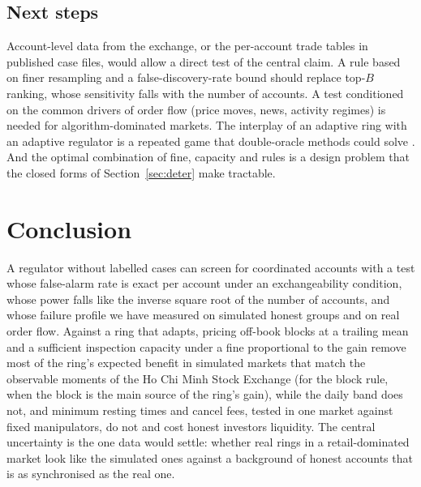 \subsection{Next steps}

Account-level data from the exchange, or the per-account trade tables in published case files, would allow a direct test of the central claim. A rule based on finer resampling and a false-discovery-rate bound should replace top-$B$ ranking, whose sensitivity falls with the number of accounts. A test conditioned on the common drivers of order flow (price moves, news, activity regimes) is needed for algorithm-dominated markets. The interplay of an adaptive ring with an adaptive regulator is a repeated game that double-oracle methods could solve \citep{mcmahan2003,lanctot2017}. And the optimal combination of fine, capacity and rules is a design problem that the closed forms of Section~\ref{sec:deter} make tractable.

\section{Conclusion}

A regulator without labelled cases can screen for coordinated accounts with a test whose false-alarm rate is exact per account under an exchangeability condition, whose power falls like the inverse square root of the number of accounts, and whose failure profile we have measured on simulated honest groups and on real order flow. Against a ring that adapts, pricing off-book blocks at a trailing mean and a sufficient inspection capacity under a fine proportional to the gain remove most of the ring's expected benefit in simulated markets that match the observable moments of the Ho Chi Minh Stock Exchange (for the block rule, when the block is the main source of the ring's gain), while the daily band does not, and minimum resting times and cancel fees, tested in one market against fixed manipulators, do not and cost honest investors liquidity. The central uncertainty is the one data would settle: whether real rings in a retail-dominated market look like the simulated ones against a background of honest accounts that is as synchronised as the real one.
